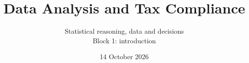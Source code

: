 \documentclass[aspectratio=169,11pt]{beamer}
\title{Data Analysis and Tax Compliance}
\subtitle{Statistical reasoning, data and decisions\\Block 1: introduction}
\date{14 October 2026}
\begin{document}
\begin{frame}[plain]\titlepage\end{frame}

\end{document}
